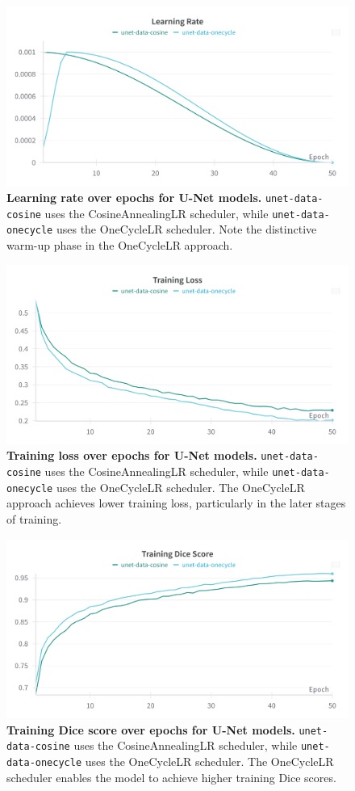 \documentclass[twocolumn,a4paper]{article}
\begin{document}
\begin{figure}[H]
\centering
\includegraphics[width=0.95\linewidth]{figs/lr_unet_lr}
\caption{\textbf{Learning rate over epochs for U-Net models.} \texttt{unet-data-cosine} uses the CosineAnnealingLR scheduler, while \texttt{unet-data-onecycle} uses the OneCycleLR scheduler. Note the distinctive warm-up phase in the OneCycleLR approach.}
\label{fig:lrunetlr}
\end{figure}
\begin{figure}[H]
\centering
\includegraphics[width=0.95\linewidth]{figs/lr_unet_train_loss}
\caption{\textbf{Training loss over epochs for U-Net models.} \texttt{unet-data-cosine} uses the CosineAnnealingLR scheduler, while \texttt{unet-data-onecycle} uses the OneCycleLR scheduler. The OneCycleLR approach achieves lower training loss, particularly in the later stages of training.}
\label{fig:lrunettrainloss}
\end{figure}
\begin{figure}[H]
\centering
\includegraphics[width=0.95\linewidth]{figs/lr_unet_train_dice}
\caption{\textbf{Training Dice score over epochs for U-Net models.} \texttt{unet-data-cosine} uses the CosineAnnealingLR scheduler, while \texttt{unet-data-onecycle} uses the OneCycleLR scheduler. The OneCycleLR scheduler enables the model to achieve higher training Dice scores.}
\label{fig:lrunettraindice}
\end{figure}
\end{document}
